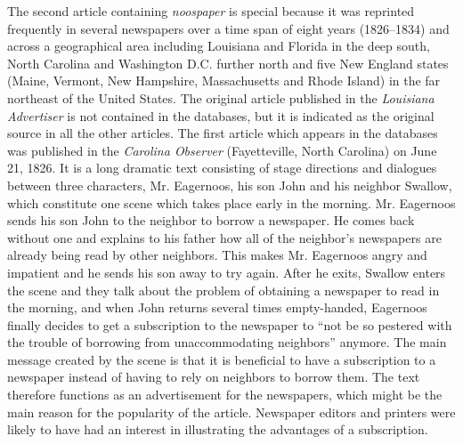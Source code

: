 The second article containing \emph{noospaper} is special because it was reprinted frequently in several newspapers over a time span of eight years (1826–1834) and across a geographical area including Louisiana and Florida in the deep south, North Carolina and Washington D.C. further north and five New England states (Maine, Vermont, New Hampshire, Massachusetts and Rhode Island) in the far northeast of the United States. The original article published in the \emph{Louisiana Advertiser} is not contained in the databases, but it is indicated as the original source in all the other articles. The first article which appears in the databases was published in the \emph{Carolina Observer} (Fayetteville, North Carolina) on June 21, 1826. It is a long dramatic text consisting of stage directions and dialogues between three characters, Mr. Eagernoos, his son John and his neighbor Swallow, which constitute one scene which takes place early in the morning. Mr. Eagernoos sends his son John to the neighbor to borrow a newspaper. He comes back without one and explains to his father how all of the neighbor’s newspapers are already being read by other neighbors. This makes Mr. Eagernoos angry and impatient and he sends his son away to try again. After he exits, Swallow enters the scene and they talk about the problem of obtaining a newspaper to read in the morning, and when John returns several times empty-handed, Eagernoos finally decides to get a subscription to the newspaper to “not be so pestered with the trouble of borrowing from unaccommodating neighbors” anymore. The main message created by the scene is that it is beneficial to have a subscription to a newspaper instead of having to rely on neighbors to borrow them. The text therefore functions as an advertisement for the newspapers, which might be the main reason for the popularity of the article. Newspaper editors and printers were likely to have had an interest in illustrating the advantages of a subscription.


